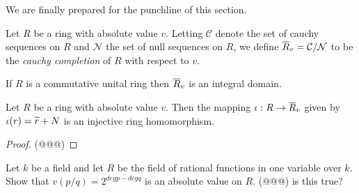 We are finally prepared for the punchline of this section.

\begin{dfn}
Let \(R\) be a ring with absolute value \(v\).
Letting \(\mathcal{C}\) denote the set of cauchy sequences on \(R\) and \(\mathcal{N}\) the set of null sequences on \(R\), we define \(\overline{R}_{v} = \mathcal{C}/\mathcal{N}\) to be the \emph{cauchy completion} of \(R\) with respect to \(v\).
\end{dfn}

\begin{prop}
\begin{proplist}
\item If \(R\) is a commutative unital ring then \(\overline{R}_{v}\) is an integral domain.
\item Let \(R\) be a ring with absolute value \(v\).
Then the mapping \(\iota : R \rightarrow \overline{R}_{v}\) given by \(\iota(r) = \widetilde{r} + N\) is an injective ring homomorphism.
\end{proplist}
\end{prop}

\begin{proof}
(@@@)
\end{proof}



\Exercises%

\begin{exercise}
Let \(k\) be a field and let \(R\) be the field of rational functions in one variable over \(k\).
Show that \(v(p/q) = 2^{deg p - deg q}\) is an absolute value on \(R\).
(@@@) is this true?
\end{exercise}
